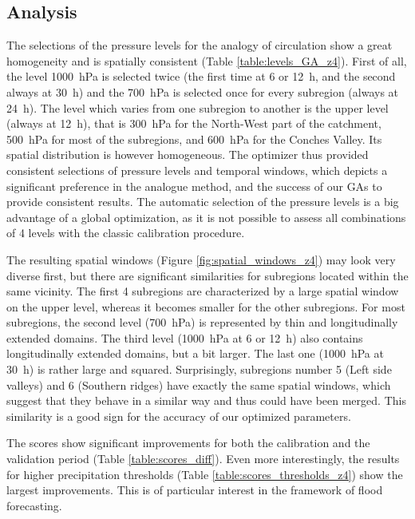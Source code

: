 \documentclass{ametsoc}
\begin{document}
\subsection{Analysis}

The selections of the pressure levels for the analogy of circulation show a great homogeneity and is spatially consistent (Table \ref{table:levels_GA_z4}). First of all, the level 1000~hPa is selected twice (the first time at 6 or 12~h, and the second always at 30~h) and the 700~hPa is selected once for every subregion (always at 24~h). The level which varies from one subregion to another is the upper level (always at 12~h), that is 300~hPa for the North-West part of the catchment, 500~hPa for most of the subregions, and 600~hPa for the Conches Valley. Its spatial distribution is however homogeneous. The optimizer thus provided consistent selections of pressure levels and temporal windows, which depicts a significant preference in the analogue method, and the success of our GAs to provide consistent results. The automatic selection of the pressure levels is a big advantage of a global optimization, as it is not possible to assess all combinations of 4 levels with the classic calibration procedure.

The resulting spatial windows (Figure \ref{fig:spatial_windows_z4}) may look very diverse first, but there are significant similarities for subregions located within the same vicinity. The first 4 subregions are characterized by a large spatial window on the upper level, whereas it becomes smaller for the other subregions. For most subregions, the second level (700~hPa) is represented by thin and longitudinally extended domains. The third level (1000~hPa at 6 or 12~h) also contains longitudinally extended domains, but a bit larger. The last one (1000~hPa at 30~h) is rather large and squared. Surprisingly, subregions number 5 (Left side valleys) and 6 (Southern ridges) have exactly the same spatial windows, which suggest that they behave in a similar way and thus could have been merged. This similarity is a good sign for the accuracy of our optimized parameters.

The scores show significant improvements for both the calibration and the validation period (Table \ref{table:scores_diff}). Even more interestingly, the results for higher precipitation thresholds (Table \ref{table:scores_thresholds_z4}) show the largest improvements. This is of particular interest in the framework of flood forecasting.
\end{document}
